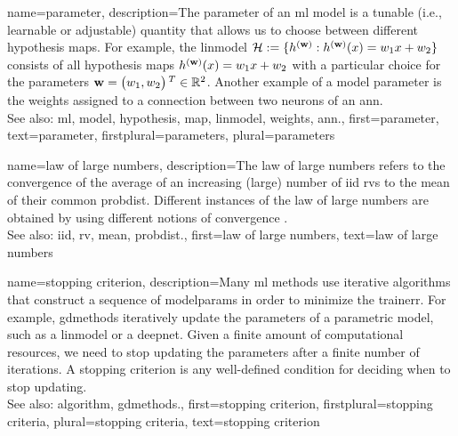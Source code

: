 {name={parameter},
	description={The parameter of an \gls{ml} \gls{model} is a tunable (i.e., learnable or adjustable) quantity that 
		allows us to choose between different \gls{hypothesis} \glspl{map}. For example, the \gls{linmodel} 
		$\mathcal{H} := \{h^{({\bf w})}: h^{({\bf w})}(x)= w_{1} x + w_{2}\}$ 
		consists of all \gls{hypothesis} \glspl{map} $h^{({\bf w})}(x)= w_{1} x + w_{2}$ 
		with a particular choice for the parameters ${\bf w} = \big(w_{1},w_{2}\big)\,^{T} \in \mathbb{R}^{2}$. 
		Another example of a \gls{model} parameter is the \gls{weights} assigned to a connection between two neurons of an \gls{ann}.
				\\
		See also: \gls{ml}, \gls{model}, \gls{hypothesis}, \gls{map}, \gls{linmodel}, \gls{weights}, \gls{ann}.},
	first={parameter},
	text={parameter},
	firstplural={parameters}, 
 	plural={parameters}
}

{name={law of large numbers},
	description={The law of large numbers refers to the 
		convergence of the average of an increasing (large) number of \gls{iid} \glspl{rv} 
		to the \gls{mean} of their common \gls{probdist}. Different instances of the 
		law of large numbers are obtained by using different notions of convergence \cite{papoulis}.
				\\
		See also: \gls{iid}, \gls{rv}, \gls{mean}, \gls{probdist}.},
	first={law of large numbers},
	text={law of large numbers}
}
    
{name={stopping criterion},
	description={Many \gls{ml} methods use iterative \glspl{algorithm} 
		that construct a sequence of \gls{modelparams} in order to minimize the \gls{trainerr}. 
		For example, \gls{gdmethods} iteratively update the \glspl{parameter} of a parametric \gls{model}, 
		such as a \gls{linmodel} or a \gls{deepnet}. Given a finite amount of computational 
		resources, we need to stop updating the \glspl{parameter} after a finite number of iterations. 
		A stopping criterion is any well-defined condition for deciding when to stop updating.
				\\
		See also: \gls{algorithm}, \gls{gdmethods}.},
	first={stopping criterion},
	firstplural={stopping criteria},
	plural={stopping criteria}, 
	text={stopping criterion}
}

